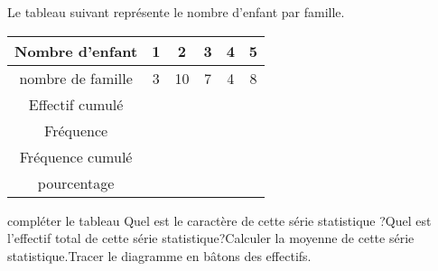 \documentclass[a4paper,addpoints,12pt]{exam}
\begin{document}
\begin{exo}[10]
Le tableau suivant représente le nombre d'enfant par famille.

\begin{tabular}{|c|c|c|c|c|c|}
\hline 
Nombre d'enfant & 1 & 2 & 3 & 4 & 5 \\ 
\hline 
nombre de famille & 3 & 10 & 7 & 4 & 8 \\ 
\hline 
Effectif cumulé  &  &  &  &  &  \\ 
\hline
Fréquence  &  &  &  &  &  \\ 
\hline 
Fréquence cumulé  &  &  &  &  &  \\ 
\hline
pourcentage &  &  &  &  &  \\ 
\hline 
\end{tabular} 
\begin{questions}
\question compléter le tableau
\question Quel est le caractère de cette série statistique ?\anserline[1]
\question Quel est l'effectif total de cette série statistique?\anserline[1]
\question Calculer la moyenne de cette série statistique.\anserline[2]
\question Tracer le diagramme en bâtons des effectifs.

\anserline[14]
\end{questions}
\end{exo}
\end{document}
